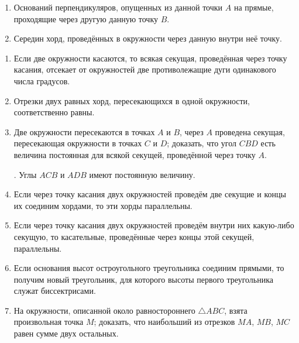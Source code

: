 \documentclass[oneside]{book}
\begin{document}
\begin{center}
\end{center}

\begin{enumerate}


 \item
Оснований перпендикуляров, опущенных из данной точки $A$ на прямые, проходящие через другую данную точку $B$.

 \item
Середин хорд, проведённых в окружности через данную внутри неё точку.

\end{enumerate}

\smallskip
{}

\begin{enumerate}[resume]

 \item
Если две окружности касаются, то всякая секущая, проведённая через точку касания, отсекает от окружностей две противолежащие дуги одинакового числа градусов.

 \item
Отрезки двух равных хорд, пересекающихся в одной окружности, соответственно равны.

 \item
Две окружности пересекаются в точках $A$ и $B$, через $A$ проведена секущая, пересекающая окружности в точках $C$ и $D$;
доказать, что угол $CBD$ есть величина постоянная для всякой секущей, проведённой через точку $A$.

\smallskip
{}.
Углы $ACB$ и $ADB$ имеют постоянную величину.

 \item
Если через точку касания двух окружностей проведём две секущие и концы их соединим хордами, то эти хорды параллельны.

 \item
Если через точку касания двух окружностей проведём внутри них какую-либо секущую, то касательные, проведённые через концы этой секущей, параллельны.

 \item
Если основания высот остроугольного треугольника соединим прямыми, то получим новый треугольник, для которого высоты первого треугольника служат биссектрисами. 

 \item
На окружности, описанной около равностороннего $\triangle ABC$, взята произвольная точка $M$;
доказать, что наибольший из отрезков $MA$, $MB$, $MC$ равен сумме двух остальных.


\end{enumerate}
\end{document}
